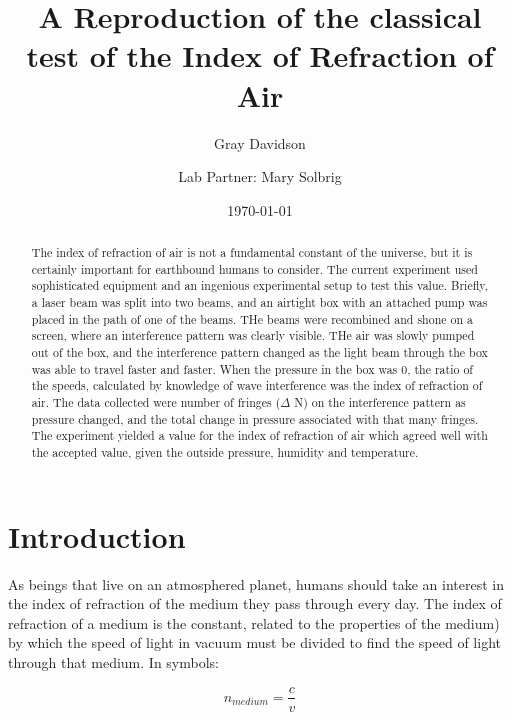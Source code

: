 \documentclass[aps,pre,twocolumn,nofootinbib]{revtex4}
\begin{document}
\title{A Reproduction of the classical test of the Index of Refraction of Air}

\author{Gray Davidson}
\author{Lab Partner: Mary Solbrig }

\date{\today}

\begin{abstract}  
The index of refraction of air is not a fundamental constant of the universe, but it is certainly important for earthbound humans to consider.  The current experiment used sophisticated equipment and an ingenious experimental setup to test this value.  Briefly, a laser beam was split into two beams, and an airtight box with an attached pump was placed in the path of one of the beams.  THe beams were recombined and shone on a screen, where an interference pattern was clearly visible.  THe air was slowly pumped out of the box, and the interference pattern changed as the light beam through the box was able to travel faster and faster.   When the pressure in the box was 0, the ratio of the speeds, calculated by knowledge of wave interference was the index of refraction of air.  The data collected were number of fringes ($\Delta$ N) on the interference pattern as pressure changed, and the total change in pressure associated with that many fringes.  The experiment yielded a value for the index of refraction of air which agreed well with the accepted value, given the outside pressure, humidity and temperature.  
\end{abstract}
\maketitle

\section{Introduction}
As beings that live on an atmosphered planet, humans should take an interest in the index of refraction of the medium they pass through every day.  The index of refraction of a medium is the constant, related to the properties of the medium) by which the speed of light in vacuum must be divided to find the speed of light through that medium.  In symbols: 

\begin{equation}
\label{nofmedium}
n_{medium}=\frac{c}{v}
\end{equation}
\end{document}
